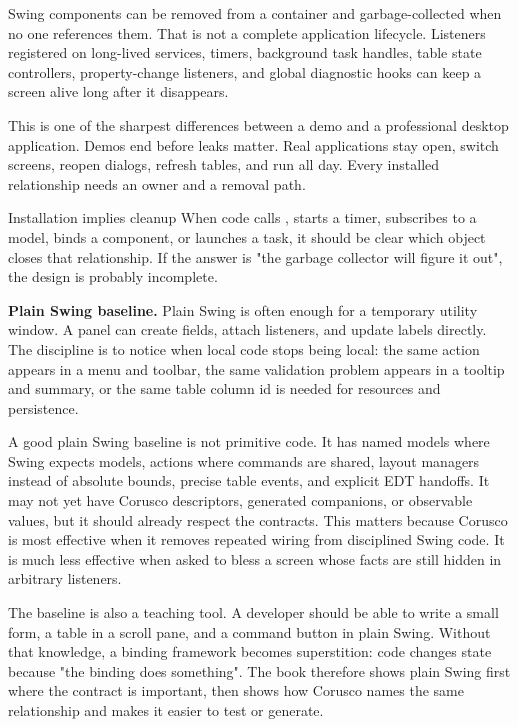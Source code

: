 Swing components can be removed from a container and garbage-collected when no one references them. That is not a complete application lifecycle. Listeners registered on long-lived services, timers, background task handles, table state controllers, property-change listeners, and global diagnostic hooks can keep a screen alive long after it disappears.

This is one of the sharpest differences between a demo and a professional desktop application. Demos end before leaks matter. Real applications stay open, switch screens, reopen dialogs, refresh tables, and run all day. Every installed relationship needs an owner and a removal path.

\begin{principlebox}{Installation implies cleanup}
When code calls , starts a timer, subscribes to a model, binds a component, or launches a task, it should be clear which object closes that relationship. If the answer is "the garbage collector will figure it out", the design is probably incomplete.
\end{principlebox}

\textbf{Plain Swing baseline.} Plain Swing is often enough for a temporary utility window. A panel can create fields, attach listeners, and update labels directly. The discipline is to notice when local code stops being local: the same action appears in a menu and toolbar, the same validation problem appears in a tooltip and summary, or the same table column id is needed for resources and persistence.

A good plain Swing baseline is not primitive code. It has named models where Swing expects models, actions where commands are shared, layout managers instead of absolute bounds, precise table events, and explicit EDT handoffs. It may not yet have Corusco descriptors, generated companions, or observable values, but it should already respect the contracts. This matters because Corusco is most effective when it removes repeated wiring from disciplined Swing code. It is much less effective when asked to bless a screen whose facts are still hidden in arbitrary listeners.

The baseline is also a teaching tool. A developer should be able to write a small form, a table in a scroll pane, and a command button in plain Swing. Without that knowledge, a binding framework becomes superstition: code changes state because "the binding does something". The book therefore shows plain Swing first where the contract is important, then shows how Corusco names the same relationship and makes it easier to test or generate.

